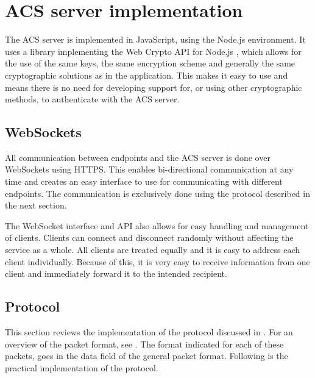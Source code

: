 \section{ACS server implementation}
\label{sec:acs_serv_imp}

  The ACS server is implemented in JavaScript, using the Node.js environment. It uses a library implementing the Web Crypto API for Node.js \cite{WebcryptoW3CWeb2018}, which allows for the use of the same keys, the same encryption scheme and generally the same cryptographic solutions as in the application. This makes it easy to use and means there is no need for developing support for, or using other cryptographic methods, to authenticate with the ACS server.

  \subsection{WebSockets}
  \label{sec:acsws}
    All communication between endpoints and the ACS server is done over WebSockets using HTTPS. This enables bi-directional communication at any time and creates an easy interface to use for communicating with different endpoints. The communication is exclusively done using the protocol described in the next section.
    
    The WebSocket interface and API also allows for easy handling and management of clients. Clients can connect and disconnect randomly without affecting the service as a whole. All clients are treated equally and it is easy to address each client individually. Because of this, it is very easy to receive information from one client and immediately forward it to the intended recipient. 

  \subsection{Protocol}
  \label{sec:prot_imp}
  This section reviews the implementation of the protocol discussed in . For an overview of the packet format, see . The format indicated for each of these packets, goes in the data field of the general packet format. Following is the practical implementation of the protocol.
